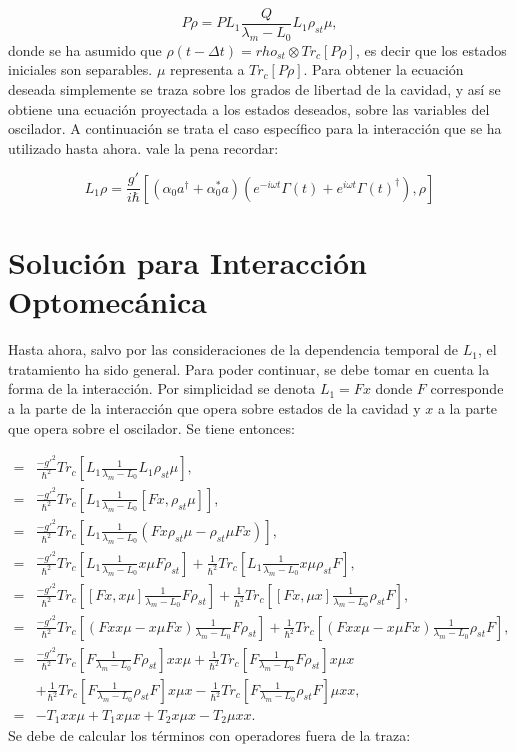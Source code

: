 \documentclass[a4paper,10pt]{report}
\begin{document}
\begin{equation}
P\dot{\rho} = PL_1 \frac{Q}{\lambda_m-L_0}L_1\rho_{st}\mu,
\end{equation} donde se ha asumido que $\rho(t-\Delta t)=rho_{st} \otimes Tr_c[P\rho]$, es decir que los estados iniciales son separables. $\mu$ representa a $Tr_c[P\rho]$. Para obtener la ecuación deseada simplemente se traza sobre los grados de libertad de la cavidad, y así se obtiene una ecuación proyectada a los estados deseados, sobre las variables del oscilador. A continuación se trata el caso específico para la interacción que se ha utilizado hasta ahora. vale la pena recordar:

\begin{equation}
L_1\rho= \frac{g'}{i\hbar}[(\alpha_0 a^{\dagger}+ \alpha_0^* a)(e^{-i\omega t}\Gamma(t)+e^{i\omega t}\Gamma(t)^{\dagger}),\rho]
\end{equation} 
 
\section{Solución para Interacción Optomecánica}

Hasta ahora, salvo por las consideraciones de la dependencia temporal de $L_1$, el tratamiento ha sido general. Para poder continuar, se debe tomar en cuenta la forma de la interacción. Por simplicidad se denota $L_1=Fx$ donde $F$ corresponde a la parte de la interacción que opera sobre estados de la cavidad y $x$ a la parte que opera sobre el oscilador. Se tiene entonces:

\begin{align*}
=&\frac{-g'^2}{\hbar^2} Tr_c[L_1\frac{1}{\lambda_m - L_0}L_1 \rho_{st}\mu],\\
=&\frac{-g'^2}{\hbar^2} Tr_c[L_1\frac{1}{\lambda_m - L_0}[Fx, \rho_{st}\mu]],\\
=&\frac{-g'^2}{\hbar^2} Tr_c[L_1\frac{1}{\lambda_m - L_0}(Fx\rho_{st}\mu-\rho_{st}\mu Fx)],\\
=&\frac{-g'^2}{\hbar^2} Tr_c[L_1\frac{1}{\lambda_m - L_0}x\mu F\rho_{st}]+\frac{1}{\hbar^2}Tr_c[L_1\frac{1}{\lambda_m - L_0}x\mu \rho_{st}F],\\
=&\frac{-g'^2}{\hbar^2} Tr_c[[Fx,x\mu]\frac{1}{\lambda_m - L_0} F\rho_{st}]+\frac{1}{\hbar^2}Tr_c[[Fx,\mu x]\frac{1}{\lambda_m - L_0}\rho_{st}F],\\
=&\frac{-g'^2}{\hbar^2} Tr_c[(Fxx\mu-x\mu Fx)\frac{1}{\lambda_m - L_0} F\rho_{st}]+\frac{1}{\hbar^2}Tr_c[(Fxx\mu-x\mu Fx)\frac{1}{\lambda_m - L_0}\rho_{st}F],\\
=&\frac{-g'^2}{\hbar^2} Tr_c[F\frac{1}{\lambda_m - L_0}F\rho_{st}]xx\mu+\frac{1}{\hbar^2}Tr_c[F\frac{1}{\lambda_m - L_0}F\rho_{st}]x\mu x\\
 &+\frac{1}{\hbar^2} Tr_c[F\frac{1}{\lambda_m - L_0}\rho_{st}F]x\mu x-\frac{1}{\hbar^2}Tr_c[F\frac{1}{\lambda_m - L_0}\rho_{st}F]\mu xx,\\
=&-T_1xx\mu+T_1x\mu x + T_2x\mu x - T_2\mu xx.
\end{align*} Se debe de calcular los términos con operadores fuera de la traza:
\end{document}
